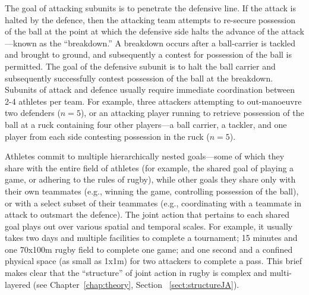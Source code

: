\begin{CJK}{UTF8}{gbsn}
The goal of attacking subunits is to penetrate the defensive line. If the attack is halted by the defence, then the attacking team attempts to re-secure possession of the ball at the point at which the defensive side halts the advance of the attack---known as the ``breakdown.''  A breakdown occurs after a ball-carrier is tackled and brought to ground, and subsequently a contest for possession of the ball is permitted.  The goal of the defensive subunit is to halt the ball carrier and subsequently successfully contest possession of the ball at the breakdown.  Subunits of attack and defence usually require immediate coordination between 2-4 athletes per team.  For example, three attackers attempting to out-manoeuvre two defenders ($n = 5$), or an attacking player running to retrieve possession of the ball at a ruck containing four other players---a ball carrier, a tackler, and one player from each side contesting possession in the ruck ($n = 5$).

Athletes commit to multiple hierarchically nested goals---some of which they share with the entire field of athletes (for example, the shared goal of playing a game, or adhering to the rules of rugby), while other goals they share only with their own teammates (e.g., winning the game, controlling possession of the ball), or with a select subset of their teammates (e.g., coordinating with a teammate in attack to outsmart the defence).  The joint action that pertains to each shared goal plays out over various spatial and temporal scales.  For example, it usually takes two days and multiple facilities to complete a tournament; 15 minutes and one 70x100m rugby field to complete one game; and one second and a confined physical space (as small as 1x1m) for two attackers to complete a pass.  This brief makes clear that the ``structure'' \citep[cf.][]{Keller2014} of joint action in rugby is complex and multi-layered (see Chapter~\ref{chap:theory}, Section ~\ref{sect:structureJA}).



\end{CJK}
